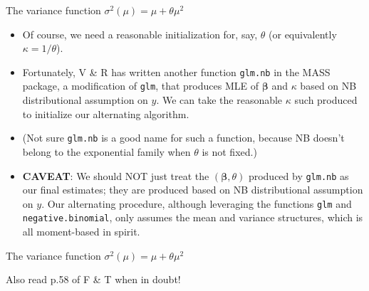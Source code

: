 \documentclass{beamer}
\newcommand{\boldbeta}{{\boldsymbol \beta}}
\newenvironment{wideitemize}%
  {\begin{itemize}%
    \setlength{\parskip}{1em}}%
  {\end{itemize}}
\begin{document}
\begin{frame} {The variance function $\sigma^2 (\mu)= \mu + \theta \mu^2 $}

\begin{wideitemize}
\item Of course, we need a reasonable initialization for, say,  $\theta$ (or equivalently $\kappa= 1/\theta$). 


\item Fortunately, V \& R has written another function \texttt{glm.nb} in the MASS package, a modification of \texttt{glm}, that produces MLE of $\boldbeta$ and $\kappa$ based on NB distributional assumption on $y$. We  can  take the reasonable $\kappa$ such produced to initialize our alternating algorithm.


\item  (Not sure \texttt{glm.nb} is a good name for such a function, because NB doesn't belong to the exponential family when $\theta$ is not fixed.)

\item {\bf CAVEAT}: We should NOT just treat the $(\boldbeta, \theta)$ produced by \texttt{glm.nb} as our final estimates; they are produced based on NB distributional assumption on $y$. Our alternating procedure, although leveraging the functions \texttt{glm} and  \texttt{negative.binomial}, only assumes the mean and variance structures, which is all moment-based in spirit. 

\end{wideitemize}
\end{frame}

\begin{frame} {The variance function $\sigma^2 (\mu)= \mu + \theta \mu^2 $}

Also read p.58 of F \& T when in doubt!

\end{frame}
\end{document}
